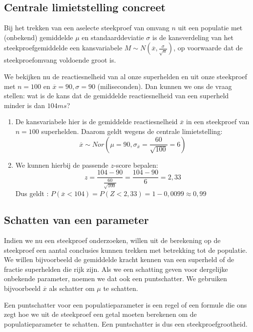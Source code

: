 {\subsection{Centrale limietstelling concreet}
Bij het trekken van een aselecte steekproef van omvang $n$ uit een populatie met (onbekend) gemiddelde $\mu$ en standaarddeviatie $\sigma$ is de kansverdeling van het steekproefgemiddelde een kansvariabele $M \sim N (\overline{x}, \frac{\sigma}{\sqrt{n}})$, op voorwaarde dat de steekproefomvang voldoende groot is.

\begin{example}
  We bekijken nu de reactiesnelheid van al onze superhelden en uit onze steekproef met $n = 100$ en $\overline{x} = 90, \sigma = 90$ (miliseconden). Dan kunnen we ons de vraag stellen: wat is de kans dat de gemiddelde reactiesnelheid van een superheld minder is dan $104 ms$?


  \begin{enumerate}
    \item De kansvariabele hier is de gemiddelde reactiesnelheid $\overline{x}$ in een steekproef van $n=100$ superhelden. Daarom geldt wegens de centrale limietstelling:
    \[ \overline{x} \sim Nor(\mu = 90, \sigma_{\overline{x}} = \frac{60}{\sqrt{100}} = 6) \]
    \item We kunnen hierbij de passende $z$-score bepalen:
    \[ z = \frac{104-90}{\frac{60}{\sqrt{100}}} = \frac{104-90}{6} = 2,33 \]
    Dus geldt : $P(\overline{x} < 104) = P(Z < 2,33) = 1 - 0,0099 \approx 0,99$
  \end{enumerate}
\end{example}

\subsection{Schatten van een parameter}
Indien we nu een steekproef onderzoeken, willen uit de berekening op de steekproef een aantal conclusies kunnen trekken met betrekking tot de populatie. We willen bijvoorbeeld de gemiddelde kracht kennen van een superheld of de fractie superhelden die rijk zijn. Als we een schatting geven voor dergelijke onbekende parameter, noemen we dat ook een puntschatter. We gebruiken bijvoorbeeld $\overline{x}$ als schatter om $\mu$ te schatten.

\begin{definition}[puntschatter]
  Een puntschatter voor een populatieparameter is een regel of een formule die ons zegt hoe we uit de steekproef een getal moeten berekenen om de populatieparameter te schatten. Een puntschatter is dus een steekproefgrootheid.
\end{definition}

}
